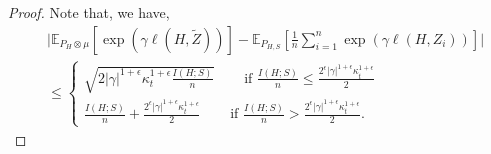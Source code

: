 \documentclass{article}
\theoremstyle{plain}
\theoremstyle{plain}
\theoremstyle{definition}
\theoremstyle{remark}
\newcommand{\mbE}{\mathbb{E}}
\begin{document}
\begin{proof}

Note that, we have,
   \begin{equation}\label{eq: vu1}
    \begin{split}
        &\Big|\mbE_{P_{H}\otimes \mu}[ \exp(\gamma \ell(H,\tilde Z))]-\mbE_{P_{H,S}}[\frac{1}{n}\sum_{i=1}^n \exp(\gamma \ell(H,Z_i))]\Big|\\
        &\leq \begin{cases}
            \sqrt{2|\gamma|^{1+\epsilon} \kappa_t^{1+\epsilon}\frac{I(H;S)}{n}}&\quad \mbox{ if } \frac{I(H;S)}{n}\leq \frac{2^{\epsilon}|\gamma|^{1+\epsilon} \kappa_t^{1+\epsilon}}{2}\\
            \frac{I(H;S)}{n}+\frac{2^{\epsilon}|\gamma|^{1+\epsilon} \kappa_t^{1+\epsilon}}{2} & \mbox{ if } \frac{I(H;S)}{n}> \frac{2^{\epsilon}|\gamma|^{1+\epsilon} \kappa_t^{1+\epsilon}}{2}
        .\end{cases}
    \end{split}
    \end{equation}


\end{proof}
\end{document}
